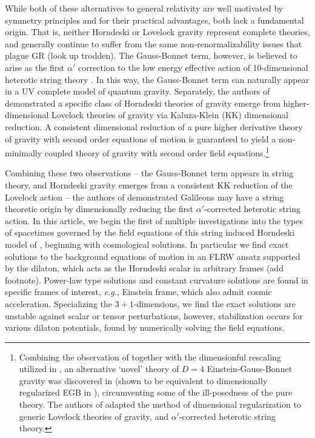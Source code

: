 \documentclass[amsmath,amssymb,11pt]{article}
\begin{document}
While both of these alternatives to general relativity are well motivated by symmetry principles and for their practical advantages, both lack a fundamental origin. That is, neither Horndeski or Lovelock gravity represent complete theories, and generally continue to suffer from the same non-renormalizability issues that plague GR (look up trodden). The Gauss-Bonnet term, however, is believed to arise as the first $\alpha'$ correction to the low energy effective action of 10-dimensional heterotic string theory \cite{Zwiebach85-1,Sen:1985qt,Gross86-1,Gross:1986mw,Metsaev:1987zx}. In this way, the Gauss-Bonnet term can naturally appear in a UV complete model of quantum gravity. Separately, the authors of \cite{VanAcoleyen11-1} demonstrated a specific class of Horndeski theories of gravity emerge from higher-dimensional Lovelock theories of gravity via Kaluza-Klein (KK) dimensional reduction. A consistent dimensional reduction of a pure higher derivative theory of gravity with second order equations of motion is guaranteed to yield a non-minimally coupled theory of gravity with second order field equations.\footnote{Combining the observation of \cite{VanAcoleyen11-1} together with the dimensionful rescaling utilized in \cite{Glavan:2019inb}, an alternative `novel' theory of $D=4$ Einstein-Gauss-Bonnet gravity was discovered in \cite{Lu:2020iav} (shown to be equivalent to dimensionally regularized EGB in \cite{Fernandes:2020nbq,Hennigar:2020lsl,Easson:2020mpq}), circumventing some of the ill-posedness of the pure theory. The authors of \cite{Easson:2020mpq} adapted the method of dimensional regularization to generic Lovelock theories of gravity, and $\alpha'$-corrected heterotic string theory.}


Combining these two observations -- the Gauss-Bonnet term appears in string theory, and Horndeski gravity emerges from a consistent KK reduction of the Lovelock action -- the authors of \cite{Easson:2020bgk} demonstrated Galileons may have a string theoretic origin by dimensionally reducing the first $\alpha'$-corrected heterotic string action. In this article, we begin the first of multiple investigations into the types of spacetimes governed by the field equations of this string induced Horndeski model of \cite{Easson:2020bgk}, beginning with cosmological solutions. In particular we find exact solutions to the background equations of motion in an FLRW ansatz supported by the dilaton, which acts as the Horndeski scalar in arbitrary frames (add footnote). Power-law type solutions and constant curvature solutions are found in specific frames of interest, \emph{e.g.}, Einstein frame, which also admit cosmic acceleration. Specializing the $3+1$-dimensions, we find the exact solutions are unstable against scalar or tensor perturbations, however, stabilization occurs for various dilaton potentials, found by numerically solving the field equations.
\end{document}
